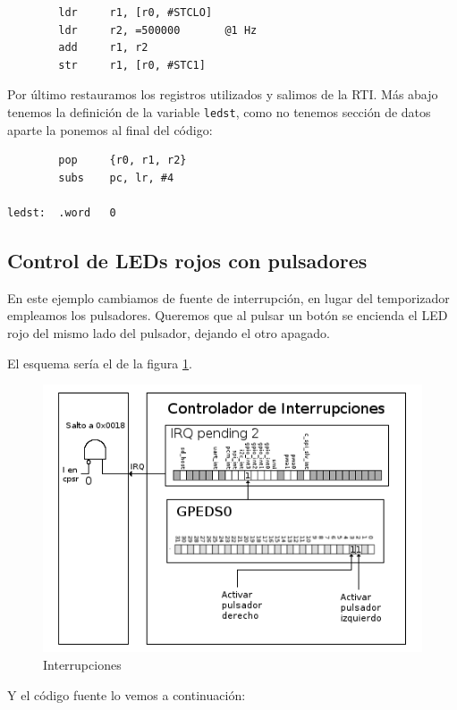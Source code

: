 \newpage
\begin{lstlisting}
        ldr     r1, [r0, #STCLO]
        ldr     r2, =500000       @1 Hz
        add     r1, r2
        str     r1, [r0, #STC1]
\end{lstlisting}

Por último restauramos los registros utilizados y salimos de la RTI. Más abajo tenemos la
definición de la variable {\tt ledst}, como no tenemos sección de datos aparte la ponemos
al final del código:

\begin{lstlisting}
        pop     {r0, r1, r2}
        subs    pc, lr, #4

ledst:  .word   0
\end{lstlisting}

\subsection{Control de LEDs rojos con pulsadores}

En este ejemplo cambiamos de fuente de interrupción, en lugar del temporizador empleamos
los pulsadores. Queremos que al pulsar un botón se encienda el LED rojo del mismo lado del
pulsador, dejando el otro apagado.

El esquema sería el de la figura \ref{fig:inter3}.

\begin{figure}[h!]
  \centering
    \includegraphics[width=12cm]{graphs/inter3.png}
  \caption{Interrupciones}
  \label{fig:inter3}
\end{figure}

\newpage
Y el código fuente lo vemos a continuación:


